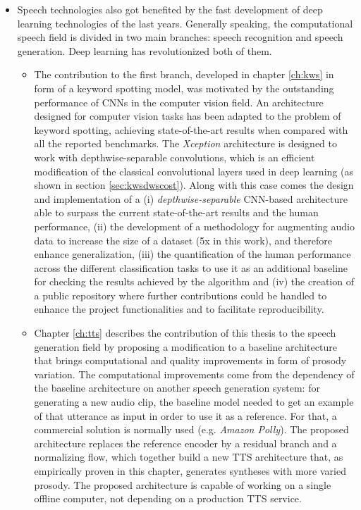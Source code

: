 \begin{itemize}
\item Speech technologies also got benefited by the fast development of deep learning technologies of the last years. Generally speaking, the computational speech field is divided in two main branches: speech recognition and speech generation. Deep learning has revolutionized both of them. 
	\begin{itemize}
		\item The contribution to the first branch, developed in chapter \ref{ch:kws} in form of a keyword spotting model, was motivated by the outstanding performance of CNNs in the computer vision field. An architecture designed for computer vision tasks has been adapted to the problem of keyword spotting, achieving state-of-the-art results when compared with all the reported benchmarks. The \textit{Xception} architecture is designed to work with depthwise-separable convolutions, which is an efficient modification of the classical convolutional layers used in deep learning (as shown in section \ref{sec:kwsdwscost}). Along with this case comes the design and implementation of a (i) \textit{depthwise-separable} CNN-based architecture able to surpass the current state-of-the-art results and the human performance, (ii) the development of a methodology for augmenting audio data to increase the size of a dataset (5x in this work), and therefore enhance generalization, (iii) the quantification of the human performance across the different classification tasks to use it as an additional baseline for checking the results achieved by the algorithm and (iv) the creation of a public repository where further contributions could be handled to enhance the project functionalities and to facilitate reproducibility.
		\item Chapter \ref{ch:tts} describes the contribution of this thesis to the speech generation field by proposing a modification to a baseline architecture that brings computational and quality improvements in form of prosody variation. The computational improvements come from the dependency of the baseline architecture on another speech generation system: for generating a new audio clip, the baseline model needed to get an example of that utterance as input in order to use it as a reference. For that, a commercial solution is normally used (e.g. \textit{Amazon Polly}). The proposed architecture replaces the reference encoder by a residual branch and a normalizing flow, which together build a new TTS architecture that, as empirically proven in this chapter, generates syntheses with more varied prosody. The proposed architecture is capable of working on a single offline computer, not depending on a production TTS service. 
	\end{itemize}
\end{itemize}

